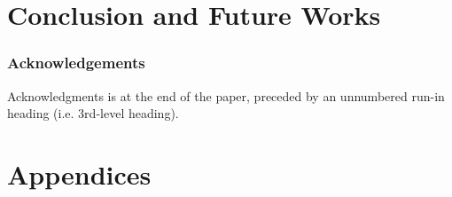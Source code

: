 \documentclass[runningheads]{llncs}
\begin{document}
\section{Conclusion and Future Works}
\label{sec:conlusion}


\subsubsection*{Acknowledgements}
Acknowledgments is at the end of the paper, preceded by an unnumbered run-in heading (i.e.
3rd-level heading).

%
%
%


%
\section*{Appendices}

\end{document}
